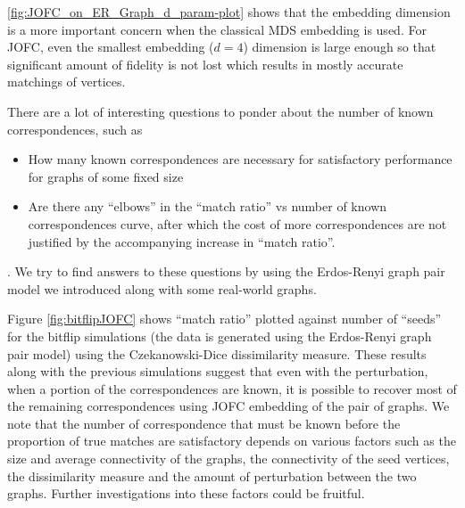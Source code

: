 \documentclass[12pt,oneside,final]{thesis}\usepackage[]{graphicx}\usepackage[]{color}
\begin{document}
\autoref{fig:JOFC_on_ER_Graph_d_param-plot} shows that the embedding dimension is a more important concern when the classical MDS embedding is used. For JOFC, even the smallest embedding ($d=4$) dimension is large enough so that significant amount of fidelity  is not  lost which results in mostly accurate matchings of vertices.



There are a lot  of interesting questions to ponder about the number of known correspondences, such as 
\begin{itemize}
\item How many known correspondences are necessary for satisfactory performance for graphs of some fixed size 
\item Are there  any ``elbows'' in the ``match ratio'' vs number of known correspondences curve,  after which the cost of more correspondences are not justified by the accompanying increase in ``match ratio''.
\end{itemize}.
We try to find answers to these questions by using the Erdos-Renyi graph pair model we introduced along with some real-world graphs.

Figure \ref{fig:bitflipJOFC} shows ``match ratio'' plotted against number of ``seeds'' for the bitflip simulations (the data is generated using the Erdos-Renyi graph pair model) using the Czekanowski-Dice dissimilarity measure. These results along with the previous simulations suggest that even with the perturbation, when a portion of the correspondences are known, it is possible to recover most of the remaining correspondences using JOFC embedding of the pair of graphs. We note that the number of correspondence that must be known before the proportion of true matches are satisfactory depends on various factors such as the size and average connectivity of the graphs, the connectivity of the seed vertices, the dissimilarity measure and the amount of perturbation between the two graphs. Further investigations into these factors could be fruitful. 
\end{document}
